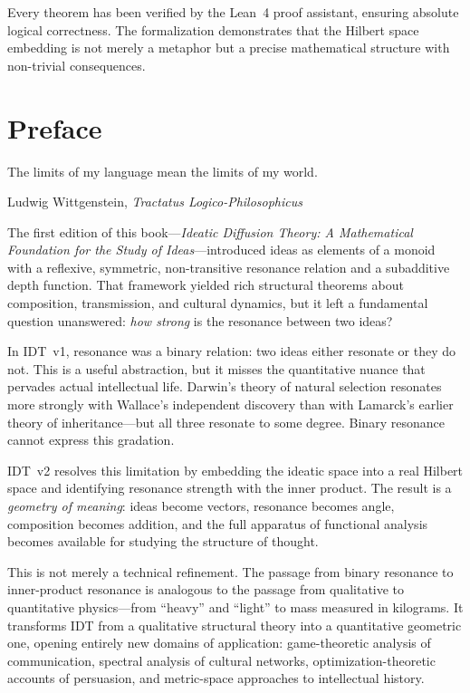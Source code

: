 \documentclass[11pt,openany]{book}
\theoremstyle{definition}
\theoremstyle{plain}
\theoremstyle{remark}
\begin{document}
Every theorem has been verified by the Lean~4 proof assistant, ensuring absolute
logical correctness. The formalization demonstrates that the Hilbert space
embedding is not merely a metaphor but a precise mathematical structure with
non-trivial consequences.

\clearpage

\chapter*{Preface}

\epigraph{The limits of my language mean the limits of my world.}{Ludwig Wittgenstein, \textit{Tractatus Logico-Philosophicus}}

The first edition of this book---\textit{Ideatic Diffusion Theory: A
Mathematical Foundation for the Study of Ideas}---introduced ideas as elements
of a monoid with a reflexive, symmetric, non-transitive resonance relation and
a subadditive depth function. That framework yielded rich structural theorems
about composition, transmission, and cultural dynamics, but it left a
fundamental question unanswered: \emph{how strong} is the resonance between two
ideas?

In IDT~v1, resonance was a binary relation: two ideas either resonate or they
do not. This is a useful abstraction, but it misses the quantitative nuance that
pervades actual intellectual life. Darwin's theory of natural selection resonates
more strongly with Wallace's independent discovery than with Lamarck's earlier
theory of inheritance---but all three resonate to some degree. Binary resonance
cannot express this gradation.

IDT~v2 resolves this limitation by embedding the ideatic space into a real
Hilbert space and identifying resonance strength with the inner product. The
result is a \emph{geometry of meaning}: ideas become vectors, resonance becomes
angle, composition becomes addition, and the full apparatus of functional
analysis becomes available for studying the structure of thought.

This is not merely a technical refinement. The passage from binary resonance to
inner-product resonance is analogous to the passage from qualitative to
quantitative physics---from ``heavy'' and ``light'' to mass measured in
kilograms. It transforms IDT from a qualitative structural theory into a
quantitative geometric one, opening entirely new domains of application:
game-theoretic analysis of communication, spectral analysis of cultural
networks, optimization-theoretic accounts of persuasion, and metric-space
approaches to intellectual history.
\end{document}
